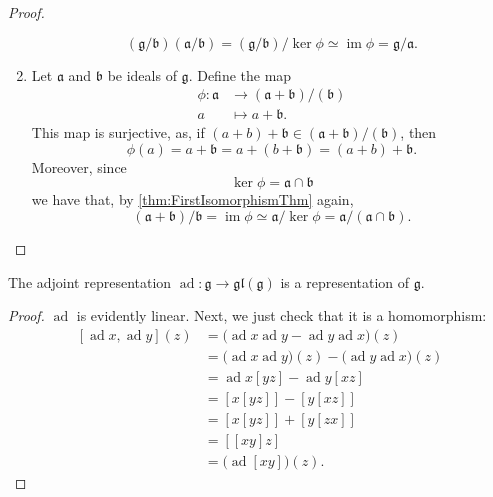 \documentclass{article}
\newcommand{\lb}[1]{\ensuremath{\left[{#1}\right]}}
\DeclareMathOperator{\im}{im}
\DeclareMathOperator{\ad}{ad}
\newcommand{\frka}{{\ensuremath{\mathfrak{a}}}}
\newcommand{\frkb}{{\ensuremath{\mathfrak{b}}}}
\newcommand{\frkg}{{\ensuremath{\mathfrak{g}}}}
\newcommand{\glalg}{\ensuremath{\mathfrak{gl}}}
\begin{document}
\begin{proof}
\begin{enumerate}[label=(\alph*)]
            \[
                (\frkg/\frkb)(\frka/\frkb)
                =
                (\frkg/\frkb)/\ker\phi
                \simeq
                \im\phi
                =
                \frkg/\frka.
            \]
        \item 
            Let $\frka$ and $\frkb$ be ideals of $\frkg$.
            Define the map
            \begin{align*}
                \phi:
                \frka 
                &\to 
                (\frka+\frkb)/(\frkb)
                \\
                a
                &\mapsto
                a + \frkb.
            \end{align*}
            This map is surjective, as, if $(a + b) + \frkb \in (\frka+\frkb)/(\frkb)$, then
            \[
                \phi(a)
                =
                a + \frkb
                =
                a + (b + \frkb)
                =
                (a + b) + \frkb.
            \]
            Moreover, since
            \[
                \ker \phi
                =
                \frka \cap \frkb
            \]
            we have that, by \ref{thm:FirstIsomorphismThm} again,
            \[
                (\frka+\frkb)/\frkb
                =
                \im \phi
                \simeq
                \frka/\ker\phi
                =
                \frka/(\frka \cap \frkb).
            \]
    \end{enumerate}
\end{proof}

\begin{theorem}
    The adjoint representation $\ad: \frkg \to \glalg(\frkg)$ is a representation of $\frkg$.
\end{theorem}

\begin{proof}
    $\ad$ is evidently linear.
    Next, we just check that it is a homomorphism:
    \begin{align*}
        \lb{\ad x, \ad y}(z)
        &=
        \Big(\ad x \ad y - \ad y \ad x\Big)(z) 
        \\
        &=
        \Big(\ad x \ad y\Big)(z) - \Big(\ad y \ad x\Big)(z) 
        \\
        &=
        \ad x \lb{yz} - \ad y \lb{xz}
        \\
        &=
        \lb{x\lb{yz}} - \lb{y\lb{xz}}
        \\
        &=
        \lb{x\lb{yz}} + \lb{y\lb{zx}}
        \\
        &=
        \lb{\lb{xy}z}
        \\
        &=
        \Big(\ad \lb{xy}\Big)(z).
    \end{align*}
\end{proof}
\end{document}
